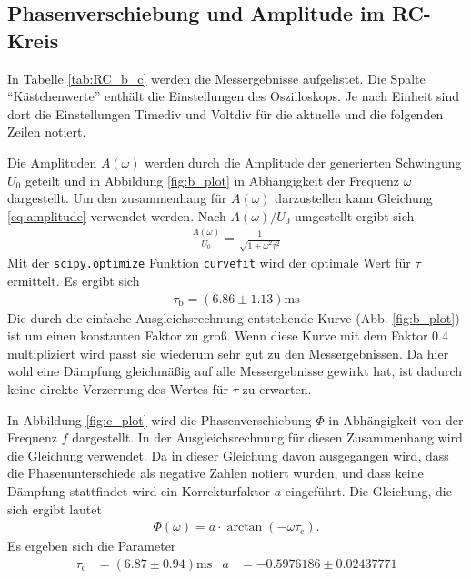 \subsection{Phasenverschiebung und Amplitude im RC-Kreis}
\label{sec:phase_ampl}
In Tabelle \ref{tab:RC_b_c} werden die Messergebnisse aufgelistet. 
Die Spalte \enquote{Kästchenwerte} enthält die Einstellungen des Oszilloskops.
Je nach Einheit sind dort die Einstellungen Timediv und Voltdiv für die aktuelle und die folgenden Zeilen notiert.
%

%
Die Amplituden $A(\omega)$ werden durch die Amplitude der generierten Schwingung $U_0$ geteilt und in Abbildung \ref{fig:b_plot}
in Abhängigkeit der Frequenz $\omega$ dargestellt.
Um den zusammenhang für $A(\omega)$ darzustellen kann Gleichung \ref{eq:amplitude} verwendet werden.
Nach $A(\omega) / U_0$ umgestellt ergibt sich
\begin{align*}
    \frac{A(\omega)}{U_0} = \frac{1}{\sqrt{1 + \omega^2  \tau^2}}
\end{align*}
Mit der \texttt{scipy.optimize} Funktion \texttt{curvefit} \cite{scipy} wird der optimale Wert für $\tau$ ermittelt.
Es ergibt sich 
\begin{align}
    \tau_\text{b} = (\num{6.86}\pm \num{1.13})\unit{\milli\s} 
    \label{eq:tau_b}
\end{align}
Die durch die einfache Ausgleichsrechnung entstehende Kurve (Abb. \ref{fig:b_plot}) ist um einen konstanten Faktor zu groß.
Wenn diese Kurve mit dem Faktor \num{0.4} multipliziert wird passt sie wiederum sehr gut zu den Messergebnissen.
Da hier wohl eine Dämpfung gleichmäßig auf alle Messergebnisse gewirkt hat,
ist dadurch keine direkte Verzerrung des Wertes für $\tau$ zu erwarten.
%


In Abbildung \ref{fig:c_plot} wird die Phasenverschiebung $\Phi$ in Abhängigkeit von der Frequenz $f$ dargestellt.
In der Ausgleichsrechnung für diesen Zusammenhang wird die Gleichung  verwendet.
Da in dieser Gleichung davon ausgegangen wird, dass die Phasenunterschiede als negative Zahlen notiert wurden,
und dass keine Dämpfung stattfindet wird ein Korrekturfaktor $a$ eingeführt.
Die Gleichung, die sich ergibt lautet
\begin{align*}
    \Phi(\omega) = a \cdot \arctan(- \omega \tau_\text{c}).
\end{align*}
Es ergeben sich die Parameter
\begin{align}
    \tau_\text{c} &= (\num{6.87} \pm \num{0.94}) \unit{\milli\s} & a &= \num{-0.5976186} \pm \num{0.02437771}
    \label{eq:tau_c}
\end{align}
% 



